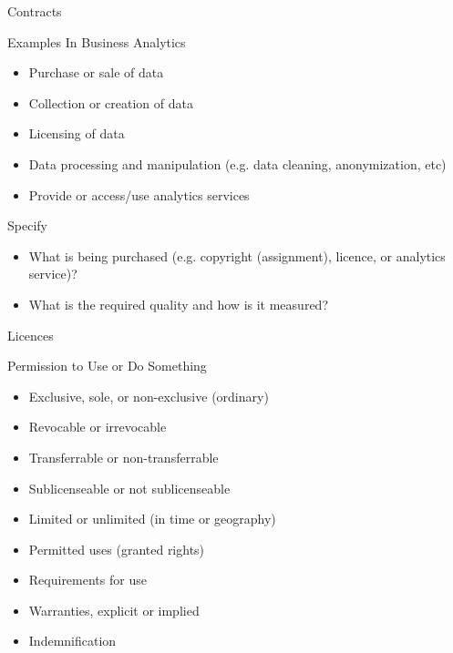 \documentclass[ignorenonframetext,xcolor=x11names]{beamer}
\begin{document}
\begin{frame}[label=full]{Contracts}
  \begin{block}{Examples In Business Analytics}
  \begin{itemize}
     \item Purchase or sale of data
     \item Collection or creation of data
     \item Licensing of data
     \item Data processing and manipulation (e.g. data cleaning, anonymization, etc)
     \item Provide or access/use analytics services
   \end{itemize}
   \end{block}
   \begin{block}{Specify}
   \begin{itemize}
      \item What is being purchased (e.g. copyright (assignment), licence, or analytics service)?
      \item What is the required quality and how is it measured?
   \end{itemize}
   \end{block}
\end{frame}

\begin{frame}[label=full]{Licences}
  \begin{block}{Permission to Use or Do Something}
  \begin{itemize}
     \item Exclusive, sole, or non-exclusive (ordinary)
     \item Revocable or irrevocable
     \item Transferrable or non-transferrable
     \item Sublicenseable or not sublicenseable
     \item Limited or unlimited (in time or geography)
     \item Permitted uses (granted rights)
     \item Requirements for use
     \item Warranties, explicit or implied
     \item Indemnification
  \end{itemize}
  \end{block}
\end{frame}
\end{document}

